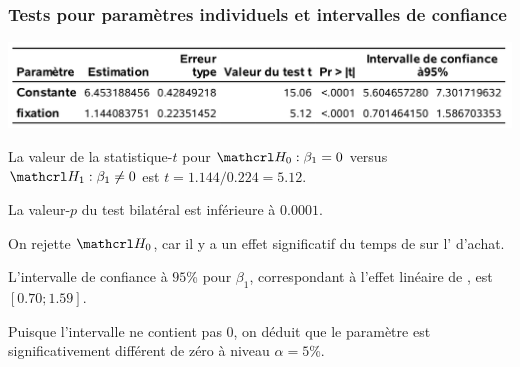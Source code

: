 \documentclass[xcolor={dvipsnames}]{beamer}
\begin{document}
\begin{frame}
\frametitle{Tests pour paramètres individuels et intervalles de confiance}

\begin{center}
\includegraphics[width=0.9\linewidth]{img/c2/diapos3-e11}
\end{center}
\bi
\item La valeur de la statistique-$t$ pour $\Hy_0: \beta_1=0$ versus $\Hy_1:\beta_1 \neq 0$ est $t=1.144/0.224=5.12$.
\item La valeur-$p$ du test bilatéral est inférieure à $0.0001$.
\item On rejette $\Hy_0$, car il y a un effet significatif du temps de    sur l' d'achat.
\item L'intervalle de confiance à $95$\% pour $\beta_1$, correspondant à l'effet linéaire de , est $[0.70; 1.59]$. 
\item Puisque l'intervalle ne contient pas $0$, on déduit que le paramètre est significativement différent de zéro à niveau $\alpha=5$\%.
\ei
\end{frame}
% 
\end{document}
